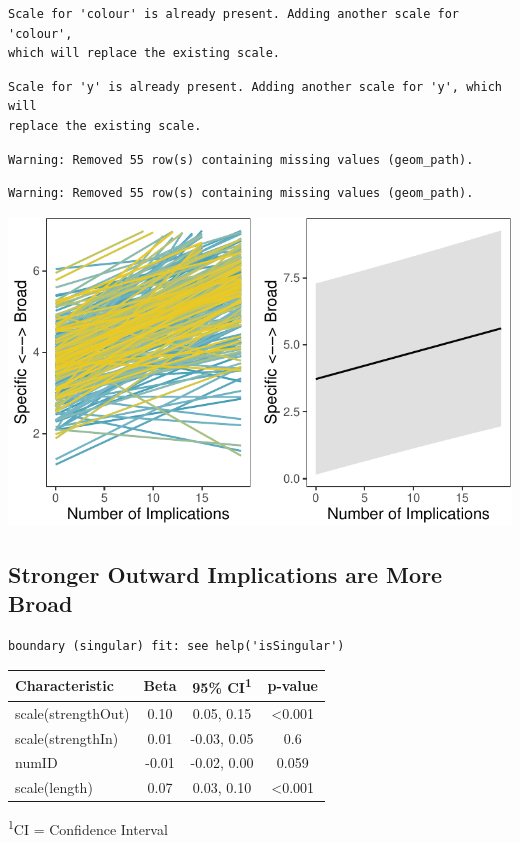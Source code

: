 \documentclass[
  .7em,
  letterpaper,
  DIV=11,
  numbers=noendperiod]{scrartcl}
\begin{document}
\begin{verbatim}
Scale for 'colour' is already present. Adding another scale for 'colour',
which will replace the existing scale.
\end{verbatim}

\begin{verbatim}
Scale for 'y' is already present. Adding another scale for 'y', which will
replace the existing scale.
\end{verbatim}

\begin{verbatim}
Warning: Removed 55 row(s) containing missing values (geom_path).
\end{verbatim}

\begin{verbatim}
Warning: Removed 55 row(s) containing missing values (geom_path).
\end{verbatim}

\includegraphics{EpMemNet_LabPres_htmldoc_files/figure-pdf/unnamed-chunk-29-1.pdf}

\hypertarget{stronger-outward-implications-are-more-broad}{%
\subsection{Stronger Outward Implications are More
Broad}\label{stronger-outward-implications-are-more-broad}}

\begin{verbatim}
boundary (singular) fit: see help('isSingular')
\end{verbatim}

\captionsetup[table]{labelformat=empty,skip=1pt}
\setlength{\LTpost}{0mm}
\begin{longtable}{lccc}
\toprule
\textbf{Characteristic} & \textbf{Beta} & \textbf{95\% CI}\textsuperscript{1} & \textbf{p-value} \\ 
\midrule
scale(strengthOut) & 0.10 & 0.05, 0.15 & <0.001 \\ 
scale(strengthIn) & 0.01 & -0.03, 0.05 & 0.6 \\ 
numID & -0.01 & -0.02, 0.00 & 0.059 \\ 
scale(length) & 0.07 & 0.03, 0.10 & <0.001 \\ 
\bottomrule
\end{longtable}
\begin{minipage}{\linewidth}
\textsuperscript{1}CI = Confidence Interval\\
\end{minipage}
\end{document}
